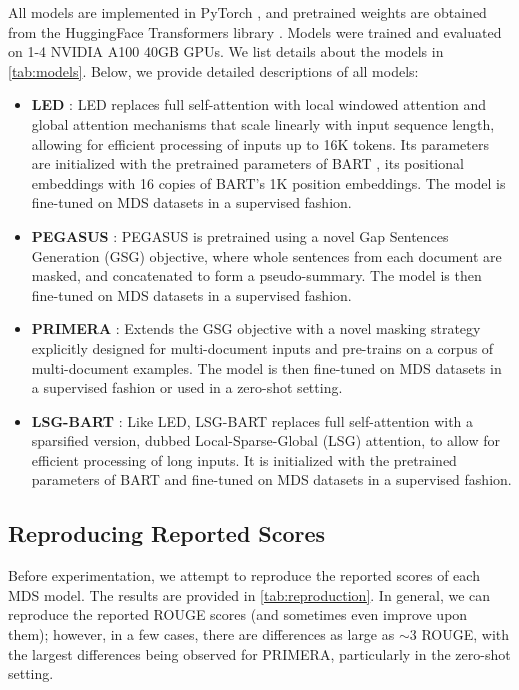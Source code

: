\documentclass[11pt]{article}
\begin{document}
All models are implemented in PyTorch \citep{pytorch}, and pretrained weights are obtained from the HuggingFace Transformers library \citep{hf-transformers}. Models were trained and evaluated on 1-4 NVIDIA A100 40GB GPUs. We list details about the models in \autoref{tab:models}. Below, we provide detailed descriptions of all models:

\begin{itemize}
    \item \textbf{LED} \citep{Beltagy2020LongformerTL}: LED replaces full self-attention with local windowed attention and global attention mechanisms that scale linearly with input sequence length, allowing for efficient processing of inputs up to 16K tokens. Its parameters are initialized with the pretrained parameters of BART \citep{lewis-etal-2020-bart}, its positional embeddings with 16 copies of BART's 1K position embeddings. The model is fine-tuned on MDS datasets in a supervised fashion.
    \item \textbf{PEGASUS} \citep{pegasus}: PEGASUS is pretrained using a novel Gap Sentences Generation (GSG) objective, where whole sentences from each document are masked, and concatenated to form a pseudo-summary. The model is then fine-tuned on MDS datasets in a supervised fashion. 
    \item \textbf{PRIMERA} \citep{xiao-etal-2022-primera}: Extends the GSG objective with a novel masking strategy explicitly designed for multi-document inputs and pre-trains on a corpus of multi-document examples. The model is then fine-tuned on MDS datasets in a supervised fashion or used in a zero-shot setting.
    \item \textbf{LSG-BART} \citep{condevaux2022lsg}: Like LED, LSG-BART replaces full self-attention with a sparsified version, dubbed Local-Sparse-Global (LSG) attention, to allow for efficient processing of long inputs. It is initialized with the pretrained parameters of BART and fine-tuned on MDS datasets in a supervised fashion.
\end{itemize}

\subsection{Reproducing Reported Scores} Before experimentation, we attempt to reproduce the reported scores of each MDS model. The results are provided in \autoref{tab:reproduction}. In general, we can reproduce the reported ROUGE scores (and sometimes even improve upon them); however, in a few cases, there are differences as large as \(\sim\)3 ROUGE, with the largest differences being observed for PRIMERA, particularly in the zero-shot setting.
\end{document}
